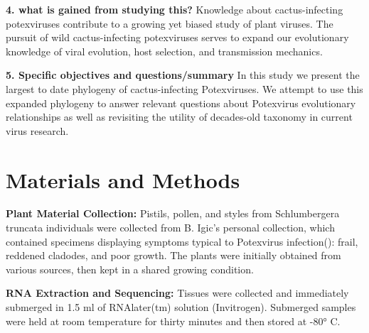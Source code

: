 \documentclass{article}
\begin{document}
\textbf{4. what is gained from studying this?} 
Knowledge about cactus-infecting potexviruses contribute to a growing yet biased study of plant viruses. 
The pursuit of wild cactus-infecting potexviruses serves to expand our evolutionary knowledge of viral evolution, host selection, and transmission mechanics. 


\textbf{5. Specific objectives and questions/summary}
In this study we present the largest to date phylogeny of cactus-infecting Potexviruses. 
We attempt to use this expanded phylogeny to answer relevant questions about Potexvirus evolutionary relationships as well as revisiting the utility of decades-old taxonomy in current virus research. 

\section*{Materials and Methods}

\textbf{Plant Material Collection:}
Pistils, pollen, and styles from Schlumbergera truncata individuals were collected from B. Igic's personal collection, which contained specimens displaying symptoms typical to Potexvirus infection(\cite{chessin_distribution_1972}): frail, reddened cladodes, and poor growth. 
The plants were initially obtained from various sources, then kept in a shared growing condition. 

\textbf{RNA Extraction and Sequencing:}
Tissues were collected and immediately submerged in 1.5 ml of  RNAlater(tm) solution (Invitrogen). 
Submerged samples were held at room temperature for thirty minutes and then stored at -80° C. 
\end{document}
